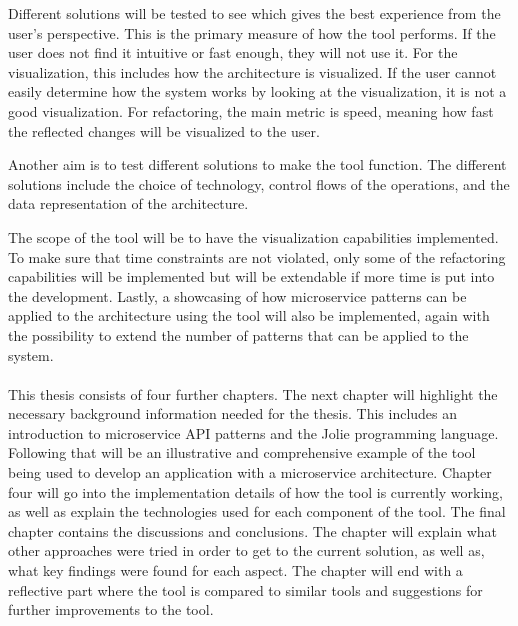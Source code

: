 Different solutions will be tested to see which gives the best experience from the user's perspective. This is the primary measure of how the tool performs. If the user does not find it intuitive or fast enough, they will not use it.
For the visualization, this includes how the architecture is visualized. If the user cannot easily determine how the system works by looking at the visualization, it is not a good visualization.
For refactoring, the main metric is speed, meaning how fast the reflected changes will be visualized to the user.

Another aim is to test different solutions to make the tool function.
The different solutions include the choice of technology, control flows of the operations, and the data representation of the architecture.

The scope of the tool will be to have the visualization capabilities implemented.
To make sure that time constraints are not violated, only some of the refactoring capabilities will be implemented but will be extendable if more time is put into the development.
Lastly, a showcasing of how microservice patterns can be applied to the architecture using the tool will also be implemented, again with the possibility to extend the number of patterns that can be applied to the system.
\\
\\
This thesis consists of four further chapters. The next chapter will highlight the necessary background information needed for the thesis. This includes an introduction to microservice API patterns and the Jolie programming language.
Following that will be an illustrative and comprehensive example of the tool being used to develop an application with a microservice architecture.
Chapter four will go into the implementation details of how the tool is currently working, as well as explain the technologies used for each component of the tool.
The final chapter contains the discussions and conclusions. The chapter will explain what other approaches were tried in order to get to the current solution, as well as, what key findings were found for each aspect.
The chapter will end with a reflective part where the tool is compared to similar tools and suggestions for further improvements to the tool.
